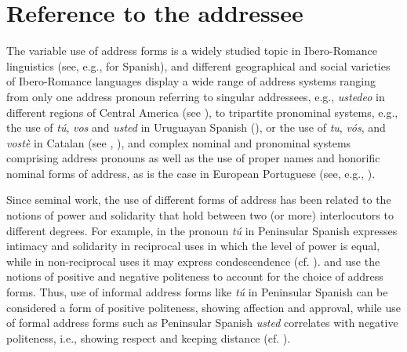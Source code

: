 \documentclass[output=paper]{langscibook}
\begin{document}
\section{Reference to the addressee}\label{sec:intro:4}

The variable use of address forms is a widely studied topic in Ibero-Romance linguistics (see, e.g., \citealt{HummelLaslop2010} for Spanish), and different geographical and social varieties of Ibero-Romance languages display a wide range of address systems ranging from only one address pronoun referring to singular addressees, e.g., \textit{ustedeo}  in different regions of Central America (see \citealt{Moser2006, QuesadaPacheco2010}), to tripartite pronominal systems, e.g., the use of \textit{tú}, \textit{vos} and \textit{usted}  in Uruguayan Spanish (\citealt{Steffen2010}), or the use of \textit{tu}, \textit{vós},  and \textit{vostè}  in Catalan (see \citealt{Robinson1980, Todolí2006, Nogué2022}, \citealt[8.2.2]{GIEC2022}), and complex nominal and pronominal systems comprising address pronouns as well as the use of proper names and honorific nominal forms of address, as is the case in European Portuguese (see, e.g., \citealt{Allen2019}).



Since  seminal work, the use of different forms of address has been related to the notions of power and solidarity that hold between two (or more) interlocutors to different degrees. For example, in the  pronoun \textit{tú}  in Peninsular Spanish expresses intimacy and solidarity in reciprocal uses in which the level of power is equal, while in non-reciprocal uses it may express condescendence (cf. \citealt[622]{Uber2016}). \citet{BrownLevinson1972} and \citet{García1992} use the notions of positive and negative politeness to account for the choice of address forms. Thus, use of informal address forms like \textit{tú}  in Peninsular Spanish can be considered a form of positive politeness, showing affection and approval, while use of formal address forms such as Peninsular Spanish \textit{usted} correlates with negative politeness, i.e., showing respect and keeping distance (cf. \citealt[622]{Uber2016}). 
\end{document}
